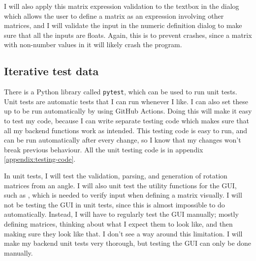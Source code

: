 \documentclass[../main.tex]{subfiles}
\begin{document}
I will also apply this matrix expression validation to the textbox in the dialog which allows the user to define a matrix as an expression involving other matrices, and I will validate the input in the numeric definition dialog to make sure that all the inputs are floats. Again, this is to prevent crashes, since a matrix with non-number values in it will likely crash the program.

\subsection{Iterative test data\label{design:iterative-test-data}}

There is a Python library called \texttt{pytest}, which can be used to run unit tests\cite{pytest-docs}. Unit tests are automatic tests that I can run whenever I like\cite{wikipedia-unit-testing}. I can also set these up to be run automatically by using GitHub Actions\cite{github-actions-docs}. Doing this will make it easy to test my code, because I can write separate testing code which makes sure that all my backend functions work as intended. This testing code is easy to run, and can be run automatically after every change, so I know that my changes won't break previous behaviour. All the unit testing code is in appendix \ref{appendix:testing-code}.

In unit tests, I will test the validation, parsing, and generation of rotation matrices from an angle. I will also unit test the utility functions for the GUI, such as , which is needed to verify input when defining a matrix visually. I will not be testing the GUI in unit tests, since this is almost impossible to do automatically. Instead, I will have to regularly test the GUI manually; mostly defining matrices, thinking about what I expect them to look like, and then making sure they look like that. I don't see a way around this limitation. I will make my backend unit tests very thorough, but testing the GUI can only be done manually.
\end{document}
